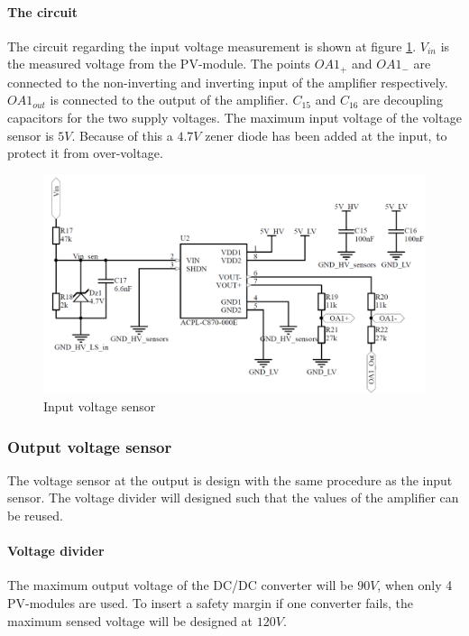 \paragraph{The circuit}
The circuit regarding the input voltage measurement is shown at figure \ref{fig:input_voltage_sensor_circuit}. $V_{in}$ is the measured voltage from the PV-module. The points $OA1_+$ and $OA1_-$ are connected to the non-inverting and inverting input of the amplifier respectively. $OA1_{out}$ is connected to the output of the amplifier. $C_{15}$ and $C_{16}$ are decoupling capacitors for the two supply voltages. The maximum input voltage of the voltage sensor is $5V$. Because of this a $4.7V$ zener diode has been added at the input, to protect it from over-voltage.

\begin{figure}[H]
	\begin{center}
		\includegraphics[width=0.7\linewidth]{../Pictures/P1/Sensors/input_voltage_sensor.PNG}
		\caption{Input voltage sensor}
		\label{fig:input_voltage_sensor_circuit}
	\end{center}
\end{figure}

\subsubsection{Output voltage sensor}
The voltage sensor at the output is design with the same procedure as the input sensor. The voltage divider will designed such that the values of the amplifier can be reused.

\paragraph{Voltage divider}
The maximum output voltage of the DC/DC converter will be $90V$, when only 4 PV-modules are used. To insert a safety margin if one converter fails, the maximum sensed voltage will be designed at $120V$.

